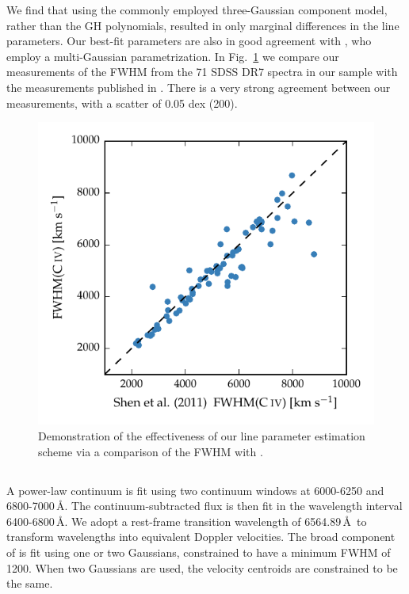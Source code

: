 We find that using the commonly employed three-Gaussian component model, rather than the GH polynomials, resulted in only marginal differences in the line parameters. 
Our best-fit parameters are also in good agreement with \citet{shen11}, who employ a multi-Gaussian parametrization. 
In Fig.~\ref{fig:shen_comparison_civ} we compare our measurements of the  FWHM from the 71 SDSS DR7 spectra in our sample with the measurements published in \citet{shen11}. 
There is a very strong agreement between our measurements, with a scatter of 0.05 dex (200\kms). 

\begin{figure}
    \centering 
    \includegraphics[width=0.8\linewidth]{figures/chapter03/shen_comparison_civ.pdf} 
    \caption{Demonstration of the effectiveness of our line parameter estimation scheme via a comparison of the  FWHM with \citet{shen11}.} 
    \label{fig:shen_comparison_civ}
\end{figure}

\subsection{\ha}
\label{sec:ha}


A power-law continuum is fit using two continuum windows at 6000-6250 and 6800-7000\,\AA. 
The continuum-subtracted flux is then fit in the wavelength interval 6400-6800\,\AA. 
We adopt a rest-frame transition wavelength of 6564.89\,\AA\, to transform wavelengths into equivalent Doppler velocities. 
The broad component of \ha is fit using one or two Gaussians, constrained to have a minimum FWHM of 1200\kms. When two Gaussians are used, the velocity centroids are constrained to be the same.

